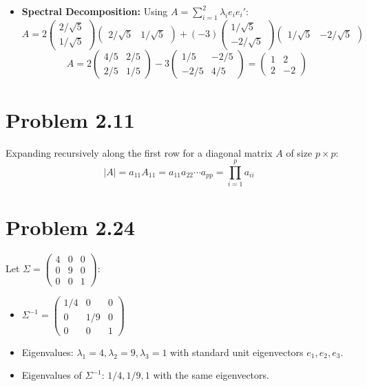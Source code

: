 \documentclass{article}
\begin{document}
\begin{itemize}
    \item \textbf{Spectral Decomposition:}
    Using $A = \sum_{i=1}^2 \lambda_i e_i e_i'$:
    \[
    A = 2 \begin{pmatrix} 2/\sqrt{5} \\ 1/\sqrt{5} \end{pmatrix} \begin{pmatrix} 2/\sqrt{5} & 1/\sqrt{5} \end{pmatrix} 
    + (-3) \begin{pmatrix} 1/\sqrt{5} \\ -2/\sqrt{5} \end{pmatrix} \begin{pmatrix} 1/\sqrt{5} & -2/\sqrt{5} \end{pmatrix}
    \]
    \[
    A = 2 \begin{pmatrix} 4/5 & 2/5 \\ 2/5 & 1/5 \end{pmatrix} - 3 \begin{pmatrix} 1/5 & -2/5 \\ -2/5 & 4/5 \end{pmatrix} = \begin{pmatrix} 1 & 2 \\ 2 & -2 \end{pmatrix}
    \]
\end{itemize}

\section*{Problem 2.11}
Expanding recursively along the first row for a diagonal matrix $A$ of size $p \times p$:
\[
|A| = a_{11}A_{11} = a_{11}a_{22}\cdots a_{pp} = \prod_{i=1}^p a_{ii}
\]

\section*{Problem 2.24}
Let $\Sigma = \begin{pmatrix}4&0&0\\ 0&9&0\\ 0&0&1\end{pmatrix}$:
\begin{itemize}
    \item[(a)] $\Sigma^{-1} = \begin{pmatrix}1/4&0&0\\ 0&1/9&0\\ 0&0&1\end{pmatrix}$
    \item[(b)] Eigenvalues: $\lambda_1 = 4, \lambda_2 = 9, \lambda_3 = 1$ with standard unit eigenvectors $e_1, e_2, e_3$.
    \item[(c)] Eigenvalues of $\Sigma^{-1}$: $1/4, 1/9, 1$ with the same eigenvectors.
\end{itemize}
\end{document}
